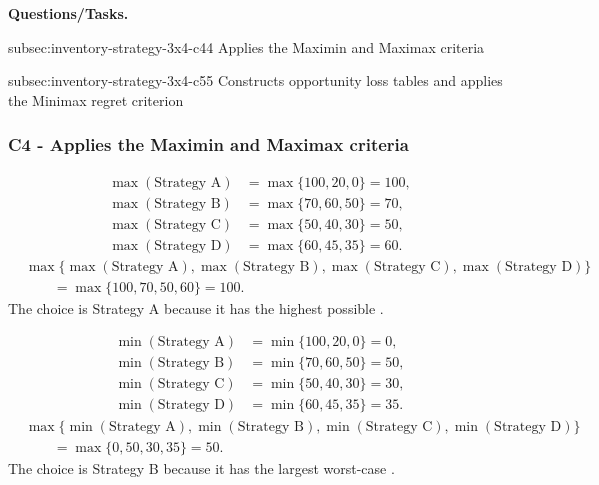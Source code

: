 	\textbf{Questions/Tasks.}
	\begin{enumerate}
		\CriterionTask
		{subsec:inventory-strategy-3x4-c4}{4}
		{Applies the Maximin and Maximax criteria}

		\CriterionTask
		{subsec:inventory-strategy-3x4-c5}{5}
		{Constructs opportunity loss tables and applies the Minimax regret criterion}
	\end{enumerate}
	
	\subsubsection*{C4 - Applies the Maximin and Maximax criteria}
	\label{subsec:inventory-strategy-3x4-c4}
	
	\[
	\begin{aligned}
		\max(\text{Strategy A}) &= \max\{100,20,0\}=100,\\
		\max(\text{Strategy B}) &= \max\{70,60,50\}=70,\\
		\max(\text{Strategy C}) &= \max\{50,40,30\}=50,\\
		\max(\text{Strategy D}) &= \max\{60,45,35\}=60.
	\end{aligned}
	\]
	\[
	\begin{aligned}
		&\max\{\max(\text{Strategy A}),\max(\text{Strategy B}),
		\max(\text{Strategy C}),\max(\text{Strategy D})\}\\
		&\qquad=\max\{100,70,50,60\}
		=100.
	\end{aligned}
	\]
	The  choice is Strategy A because it has the highest possible .
	
	\[
	\begin{aligned}
		\min(\text{Strategy A}) &= \min\{100,20,0\}=0,\\
		\min(\text{Strategy B}) &= \min\{70,60,50\}=50,\\
		\min(\text{Strategy C}) &= \min\{50,40,30\}=30,\\
		\min(\text{Strategy D}) &= \min\{60,45,35\}=35.
	\end{aligned}
	\]
	\[
	\begin{aligned}
		&\max\{\min(\text{Strategy A}),\min(\text{Strategy B}),
		\min(\text{Strategy C}),\min(\text{Strategy D})\}\\
		&\qquad=\max\{0,50,30,35\}
		=50.
	\end{aligned}
	\]
	The  choice is Strategy B because it has the largest worst-case .
	
